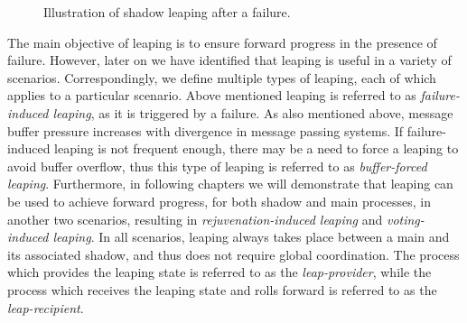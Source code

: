 \begin{figure}[!h]
	\begin{center}
	\end{center}
	\caption{Illustration of shadow leaping after a failure.}
	\label{fig:leap}
\end{figure}

The main objective of leaping is to ensure forward
progress in the presence of failure. However, later on we have identified that leaping is useful in a variety of scenarios. Correspondingly, we define multiple types of leaping, each of which applies to a particular scenario. Above mentioned leaping is referred to as \textit{failure-induced leaping}, as it is triggered by a failure. As also mentioned above, message buffer pressure increases with divergence in message passing systems. If failure-induced leaping is not frequent enough, there may be a need to force a leaping to avoid buffer overflow, thus this type of leaping is referred to as \textit{buffer-forced leaping}. Furthermore, in following chapters we will demonstrate that leaping can be used to achieve forward progress, for both shadow and main processes, in another two scenarios, resulting in \textit{rejuvenation-induced leaping} and \textit{voting-induced leaping}. In all scenarios, leaping always takes
place between a main and its associated shadow, and thus
does not require global coordination. The process which
provides the leaping state is referred to as the \textit{leap-provider},
while the process which receives the leaping
state and rolls forward is referred to as the \textit{leap-recipient}.



